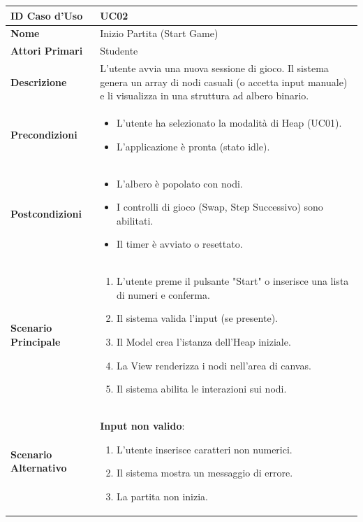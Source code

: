\documentclass[openany]{theme/uniprthesis}
\begin{document}
\begin{xltabular}{\textwidth}{|l|X|}
\hline
\textbf{ID Caso d'Uso} & UC02 \\
\hline
\textbf{Nome} & Inizio Partita (Start Game) \\
\hline
\textbf{Attori Primari} & Studente \\
\hline
\textbf{Descrizione} & L'utente avvia una nuova sessione di gioco. Il sistema genera un array di nodi casuali (o accetta input manuale) e li visualizza in una struttura ad albero binario. \\
\hline
\textbf{Precondizioni} & \begin{itemize}
    \item L'utente ha selezionato la modalità di Heap (UC01).
    \item L'applicazione è pronta (stato idle).
\end{itemize} \\
\hline
\textbf{Postcondizioni} & \begin{itemize}
    \item L'albero è popolato con nodi.
    \item I controlli di gioco (Swap, Step Successivo) sono abilitati.
    \item Il timer è avviato o resettato.
\end{itemize} \\
\hline
\textbf{Scenario Principale} & \begin{enumerate}
    \item L'utente preme il pulsante "Start" o inserisce una lista di numeri e conferma.
    \item Il sistema valida l'input (se presente).
    \item Il Model crea l'istanza dell'Heap iniziale.
    \item La View renderizza i nodi nell'area di canvas.
    \item Il sistema abilita le interazioni sui nodi.
\end{enumerate} \\
\hline
\textbf{Scenario Alternativo} & \textbf{Input non valido}:
\begin{enumerate}
    \item L'utente inserisce caratteri non numerici.
    \item Il sistema mostra un messaggio di errore.
    \item La partita non inizia.
\end{enumerate} \\
\hline
\end{xltabular}
\end{document}
